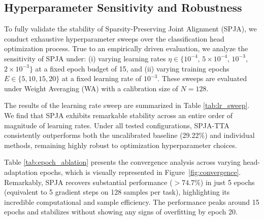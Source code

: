 \documentclass{article}
\theoremstyle{plain}
\theoremstyle{definition}
\theoremstyle{remark}
\begin{document}
\subsection{Hyperparameter Sensitivity and Robustness}
To fully validate the stability of Sparsity-Preserving Joint Alignment (SPJA), we conduct exhaustive hyperparameter sweeps over the classification head optimization process. True to an empirically driven evaluation, we analyze the sensitivity of SPJA under: (i) varying learning rates $\eta \in \{10^{-4}$, $5\times 10^{-4}$, $10^{-3}$, $2\times 10^{-3}\}$ at a fixed epoch budget of 15, and (ii) varying training epochs $E \in \{5, 10, 15, 20\}$ at a fixed learning rate of $10^{-3}$. These sweeps are evaluated under Weight Averaging (WA) with a calibration size of $N=128$.

The results of the learning rate sweep are summarized in Table \ref{tab:lr_sweep}. We find that SPJA exhibits remarkable stability across an entire order of magnitude of learning rates. Under all tested configurations, SPJA-TTA consistently outperforms both the uncalibrated baseline (29.22\%) and individual methods, remaining highly robust to optimization hyperparameter choices.

Table \ref{tab:epoch_ablation} presents the convergence analysis across varying head-adaptation epochs, which is visually represented in Figure~\ref{fig:convergence}. Remarkably, SPJA recovers substantial performance ($>74.7\%$) in just 5 epochs (equivalent to 5 gradient steps on 128 samples per task), highlighting its incredible computational and sample efficiency. The performance peaks around 15 epochs and stabilizes without showing any signs of overfitting by epoch 20.
\end{document}
